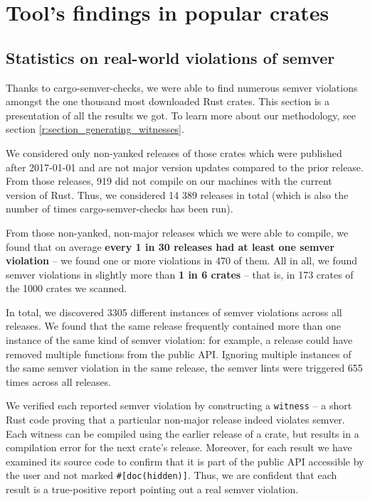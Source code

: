 \documentclass[licencjacka,en]{pracamgr}
\begin{document}

\chapter{Tool's findings in popular crates}\label{r:chapter_semver_crater}

\section{Statistics on real-world violations of semver}\label{r:section_results_statistics}

Thanks to cargo-semver-checks, we were able to find numerous semver violations
amongst the one thousand most downloaded Rust crates.
This section is a presentation of all the results we got. To learn more about
our methodology, see section \ref{r:section_generating_witnesses}.

We considered only non-yanked releases of those crates which were published
after 2017-01-01 and are not major version updates compared to the prior release. From those releases,
919 did not compile on our machines with the current version of Rust.
Thus, we considered 14 389 releases in total (which is also the number of times
cargo-semver-checks has been run).

From those non-yanked, non-major releases which we were able to compile, we found that
on average \textbf{every 1 in 30 releases had at least one semver violation}
-- we found one or more violations in 470 of them.
All in all, we found semver violations in slightly more than \textbf{1 in 6 crates}
-- that is, in 173 crates of the 1000 crates we scanned.

In total, we discovered 3305 different instances of semver violations across all releases.
We found that the same release frequently contained more than one instance of the same kind of semver violation:
for example, a release could have removed multiple functions from the public API. Ignoring multiple instances
of the same semver violation in the same release, the semver lints were triggered 655 times across all releases.

We verified each reported semver violation by constructing a \texttt{witness} -- a short Rust code
proving that a particular non-major release indeed violates semver.
Each witness can be compiled using the earlier release of a crate,
but results in a compilation error for the next crate's release.
Moreover, for each result we have examined its source code to confirm
that it is part of the public API accessible by the user and not marked \texttt{\#[doc(hidden)]}. Thus, we are confident that each
result is a true-positive report pointing out a real semver violation.
\end{document}
